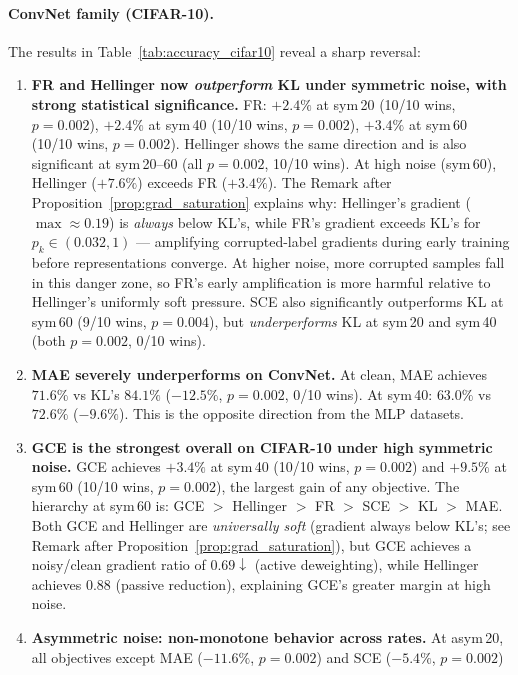 \documentclass[11pt]{article}
\begin{document}
\paragraph{ConvNet family (CIFAR-10).}
\label{sec:convnet_results}%
The results in Table~\ref{tab:accuracy_cifar10} reveal a sharp reversal:
\begin{enumerate}
  \item \textbf{FR and Hellinger now \emph{outperform} KL under symmetric noise, with strong statistical significance.}
    FR: $+2.4\%$ at sym\,20 (10/10 wins, $p=0.002$), $+2.4\%$ at sym\,40 (10/10 wins, $p=0.002$),
    $+3.4\%$ at sym\,60 (10/10 wins, $p=0.002$).
    Hellinger shows the same direction and is also significant at sym\,20--60 (all $p=0.002$, 10/10 wins).
    At high noise (sym\,60), Hellinger ($+7.6\%$) exceeds FR ($+3.4\%$).
    The Remark after Proposition~\ref{prop:grad_saturation} explains why:
    Hellinger's gradient ($\max \approx 0.19$) is \emph{always} below KL's,
    while FR's gradient exceeds KL's for $p_k \in (0.032, 1)$ — amplifying
    corrupted-label gradients during early training before representations converge.
    At higher noise, more corrupted samples fall in this danger zone, so FR's
    early amplification is more harmful relative to Hellinger's uniformly soft pressure.
    SCE also significantly outperforms KL at sym\,60 (9/10 wins, $p=0.004$), but
    \emph{underperforms} KL at sym\,20 and sym\,40 (both $p=0.002$, 0/10 wins).
  \item \textbf{MAE severely underperforms on ConvNet.}
    At clean, MAE achieves $71.6\%$ vs KL's $84.1\%$ ($-12.5\%$, $p=0.002$, 0/10 wins).
    At sym\,40: $63.0\%$ vs $72.6\%$ ($-9.6\%$). This is the opposite direction from the MLP datasets.
  \item \textbf{GCE is the strongest overall on CIFAR-10 under high symmetric noise.}
    GCE achieves $+3.4\%$ at sym\,40 (10/10 wins, $p=0.002$) and $+9.5\%$ at sym\,60 (10/10 wins, $p=0.002$),
    the largest gain of any objective.
    The hierarchy at sym\,60 is: GCE $>$ Hellinger $>$ FR $>$ SCE $>$ KL $>$ MAE.
    Both GCE and Hellinger are \emph{universally soft} (gradient always below KL's; see Remark after Proposition~\ref{prop:grad_saturation}),
    but GCE achieves a noisy/clean gradient ratio of $0.69\downarrow$ (active deweighting),
    while Hellinger achieves $0.88$ (passive reduction), explaining GCE's greater margin at high noise.
  \item \textbf{Asymmetric noise: non-monotone behavior across rates.}
    At asym\,20, all objectives except MAE ($-11.6\%$, $p=0.002$) and SCE ($-5.4\%$, $p=0.002$)

\end{enumerate}
\end{document}

